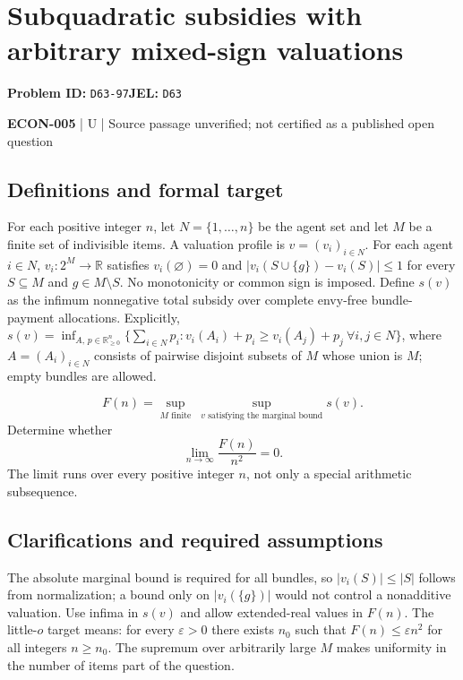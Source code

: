\documentclass[11pt,a4paper]{article}
\begin{document}
\section*{Subquadratic subsidies with arbitrary mixed-sign valuations}
\textbf{Problem ID:} \texttt{D63-97}\quad \textbf{JEL:} \texttt{D63}\par
\label{problem:OP-0592}


\label{audited:ECON-005}

{\sffamily\small\color{muted}\textbf{ECON-005} | U | Source passage unverified; not certified as a published open question\par}

\subsection*{Definitions and formal target}

For each positive integer $n$, let $N=\{1,\ldots,n\}$ be the agent set and let $M$ be a finite set of indivisible items. A valuation profile is $v=(v_i)_{i\in N}$. For each agent $i\in N$, $v_i:2^M\to\mathbb R$ satisfies $v_i(\varnothing)=0$ and $|v_i(S\cup\{g\})-v_i(S)|\leq1$ for every $S\subseteq M$ and $g\in M\setminus S$. No monotonicity or common sign is imposed. Define $s(v)$ as the infimum nonnegative total subsidy over complete envy-free bundle-payment allocations. Explicitly, $s(v)=\inf_{A,\,p\in\mathbb R_{\geq0}^n}\{\sum_{i\in N} p_i:v_i(A_i)+p_i\geq v_i(A_j)+p_j\ \forall i,j\in N\}$, where $A=(A_i)_{i\in N}$ consists of pairwise disjoint subsets of $M$ whose union is $M$; empty bundles are allowed.

\[
 F(n)=\sup_{M\text{ finite}}\ \sup_{v\text{ satisfying the marginal bound}}s(v).
\]
Determine whether
\[
 \lim_{n\to\infty}\frac{F(n)}{n^2}=0.
\]
The limit runs over every positive integer $n$, not only a special arithmetic subsequence.

\subsection*{Clarifications and required assumptions}

The absolute marginal bound is required for all bundles, so $|v_i(S)|\leq|S|$ follows from normalization; a bound only on $|v_i(\{g\})|$ would not control a nonadditive valuation. Use infima in $s(v)$ and allow extended-real values in $F(n)$. The little-$o$ target means: for every $\varepsilon>0$ there exists $n_0$ such that $F(n)\leq\varepsilon n^2$ for all integers $n\geq n_0$. The supremum over arbitrarily large $M$ makes uniformity in the number of items part of the question.
\end{document}
